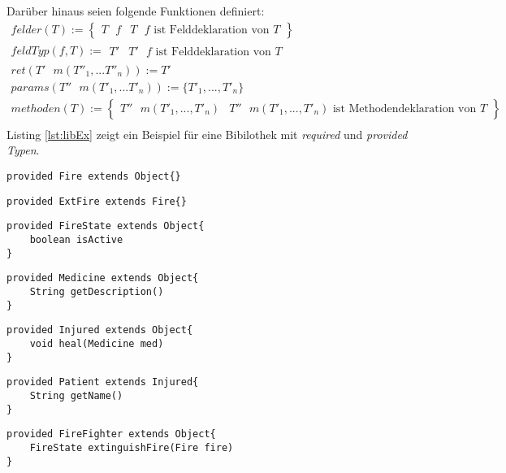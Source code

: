\noindent
Darüber hinaus seien folgende Funktionen definiert:
\begin{gather*}
\mathit{felder(T)} :=  \left\{ 
				\begin{array}{l|l}
					T \texttt{ }\mathit{f} & T \texttt{ }\mathit{f}\text{ ist Felddeklaration von }T
				\end{array}
              \right\}
\\
\mathit{feldTyp(f,T)} := 
				\begin{array}{l|l}
					T' & T' \texttt{ }\mathit{f}\text{ ist Felddeklaration von }T
				\end{array}   
\\
\mathit{ret(T'\text{ }m(T''_1,...T''_n))} := T'
\\
\mathit{params(T''\text{ }m(T'_1,...T'_n))} := \{ T'_1,...,T'_n \}
\\   
\mathit{methoden(T)} := \left\{ 
				\begin{array}{l|l}
					T'' \text{ }m(T'_1,...,T'_n) & T'' \text{ }m(T'_1,...,T'_n) \text{ ist Methodendeklaration von }T
				\end{array}
              \right\}
\\        
\end{gather*}
\noindent
Listing \ref{lst:libEx} zeigt ein Beispiel für eine Bibilothek mit \emph{required} und \emph{provided Typen}.
\begin{lstlisting}[style = dsl]
provided Fire extends Object{}
\end{lstlisting}

\begin{lstlisting}[style = dsl]
provided ExtFire extends Fire{}
\end{lstlisting}


\begin{lstlisting}[style = dsl]
provided FireState extends Object{
	boolean isActive
}
\end{lstlisting}

\begin{lstlisting}[style = dsl]
provided Medicine extends Object{
	String getDescription()
}
\end{lstlisting}

\begin{lstlisting}[style = dsl]
provided Injured extends Object{
	void heal(Medicine med)	
}
\end{lstlisting}


\begin{lstlisting}[style = dsl]
provided Patient extends Injured{
	String getName()
}
\end{lstlisting}
\begin{lstlisting}[style = dsl]
provided FireFighter extends Object{
	FireState extinguishFire(Fire fire)
}
\end{lstlisting}

